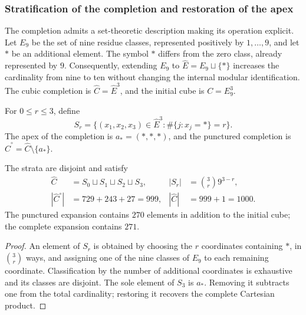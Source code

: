 \subsubsection{Stratification of the completion and restoration of the apex}
\label{sec:revision-emrh}

The completion admits a set-theoretic description making its operation
explicit. Let \(E_9\) be the set of nine residue classes, represented
positively by \(1,\ldots,9\), and let \(\ast\) be an additional element.
The symbol \(\ast\) differs from the zero class, already represented by \(9\).
Consequently, extending \(E_9\) to
\(\widehat E=E_9\sqcup\{\ast\}\) increases the cardinality from nine
to ten without changing the internal modular identification. The cubic
completion is \(\widehat C=\widehat E^3\), and the initial cube is \(C=E_9^3\).

\begin{definition}
For \(0\leq r\leq3\), define
\[
 S_r=\{(x_1,x_2,x_3)\in\widehat E^3:
             \#\{j:x_j=\ast\}=r\}.
\]
The apex of the completion is \(a_\ast=(\ast,\ast,\ast)\), and the
punctured completion is \(\widehat C^{\circ}=\widehat C\setminus\{a_\ast\}\).
\end{definition}

\begin{proposition}
The strata are disjoint and satisfy
\begin{align}
 \widehat C&=S_0\sqcup S_1\sqcup S_2\sqcup S_3,
 &|S_r|&=\binom3r9^{3-r},\label{eq:revision-estratos}\\
 |\widehat C^{\circ}|&=729+243+27=999,
 &|\widehat C|&=999+1=1000.\label{eq:revision-999}
\end{align}
The punctured expansion contains \(270\) elements in addition to the
initial cube; the complete expansion contains \(271\).
\end{proposition}
\begin{proof}
An element of \(S_r\) is obtained by choosing the \(r\) coordinates
containing \(\ast\), in \(\binom3r\) ways, and assigning one of the
nine classes of \(E_9\) to each remaining coordinate. Classification by
the number of additional coordinates is exhaustive and its classes are
disjoint. The sole element of \(S_3\) is \(a_\ast\). Removing it
subtracts one from the total cardinality; restoring it recovers the
complete Cartesian product.
\end{proof}

